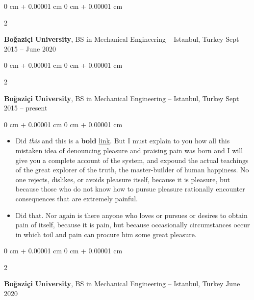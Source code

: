 \documentclass[10pt, letterpaper]{article}
\newenvironment{highlights}{
    \begin{itemize}[
        topsep=0.10 cm,
        parsep=0.10 cm,
        partopsep=0pt,
        itemsep=0pt,
        leftmargin=0 cm + 10pt
    ]
}{
    \end{itemize}
} %
\newenvironment{onecolentry}{
    \begin{adjustwidth}{
        0 cm + 0.00001 cm
    }{
        0 cm + 0.00001 cm
    }
}{
    \end{adjustwidth}
} %
\newenvironment{twocolentry}[2][]{
    \onecolentry
    \def\secondColumn{#2}
    \setcolumnwidth{\fill, 4.5 cm}
    \begin{paracol}{2}
}{
    \switchcolumn \raggedleft \secondColumn
    \end{paracol}
    \endonecolentry
} %
\begin{document}
        \vspace{0.2 cm}

        \begin{twocolentry}{
            Sept 2015 – June 2020
        }
            \textbf{Boğaziçi University}, BS in Mechanical Engineering -- Istanbul, Turkey\end{twocolentry}



        \vspace{0.2 cm}

        \begin{twocolentry}{
            Sept 2015 – present
        }
            \textbf{Boğaziçi University}, BS in Mechanical Engineering -- Istanbul, Turkey\end{twocolentry}

        \vspace{0.10 cm}
        \begin{onecolentry}
            \begin{highlights}
                \item Did \textit{this} and this is a \textbf{bold} \href{https://example.com}{link}. But I must explain to you how all this mistaken idea of denouncing pleasure and praising pain was born and I will give you a complete account of the system, and expound the actual teachings of the great explorer of the truth, the master-builder of human happiness. No one rejects, dislikes, or avoids pleasure itself, because it is pleasure, but because those who do not know how to pursue pleasure rationally encounter consequences that are extremely painful.
                \item Did that. Nor again is there anyone who loves or pursues or desires to obtain pain of itself, because it is pain, but because occasionally circumstances occur in which toil and pain can procure him some great pleasure.
            \end{highlights}
        \end{onecolentry}


        \vspace{0.2 cm}

        \begin{twocolentry}{
            June 2020
        }
            \textbf{Boğaziçi University}, BS in Mechanical Engineering -- Istanbul, Turkey\end{twocolentry}
\end{document}
